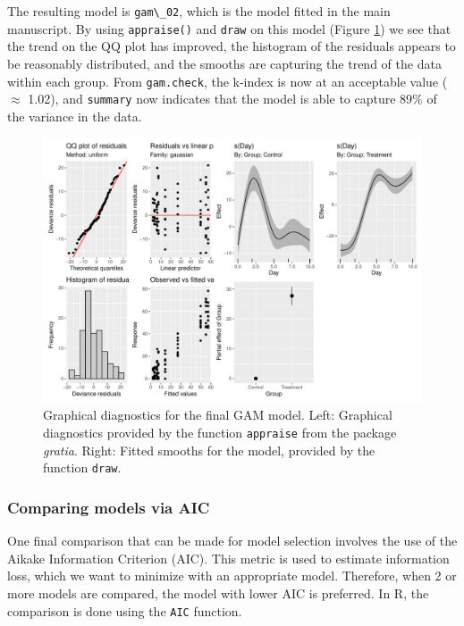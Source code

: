 \documentclass[
]{article}
\newcommand{\passthrough}[1]{#1}
\begin{document}
The resulting model is \passthrough{\lstinline!gam\_02!}, which is the model fitted in the main manuscript. By using \passthrough{\lstinline!appraise()!} and \passthrough{\lstinline!draw!} on this model (Figure \ref{fig:final-GAM-diag}) we see that the trend on the QQ plot has improved, the histogram of the residuals appears to be reasonably distributed, and the smooths are capturing the trend of the data within each group. From \passthrough{\lstinline!gam.check!}, the k-index is now at an acceptable value (\(\approx\) 1.02), and \passthrough{\lstinline!summary!} now indicates that the model is able to capture 89\% of the variance in the data.



\begin{figure}

{\centering \includegraphics[width=0.75\linewidth]{SIM_Appendix_files/figure-latex/final-GAM-diag-1} 

}

\caption{Graphical diagnostics for the final GAM model. Left: Graphical diagnostics provided by the function \passthrough{\lstinline!appraise!} from the package \emph{gratia}. Right: Fitted smooths for the model, provided by the function \passthrough{\lstinline!draw!}.}\label{fig:final-GAM-diag}
\end{figure}

\hypertarget{comparing-models-via-aic}{%
\subsubsection{Comparing models via AIC}\label{comparing-models-via-aic}}

One final comparison that can be made for model selection involves the use of the Aikake Information Criterion (AIC). This metric is used to estimate information loss, which we want to minimize with an appropriate model. Therefore, when 2 or more models are compared, the model with lower AIC is preferred. In R, the comparison is done using the \passthrough{\lstinline!AIC!} function.
\end{document}
